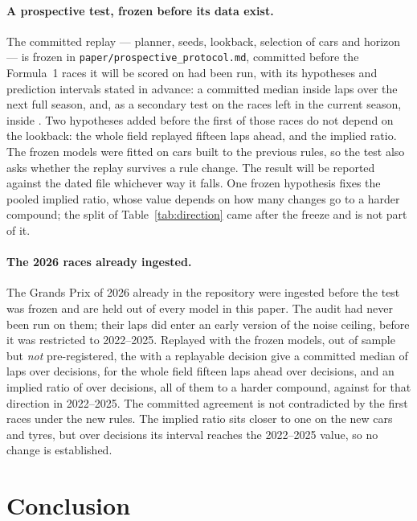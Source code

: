 \documentclass[11pt,a4paper]{article}
\begin{document}
\paragraph{A prospective test, frozen before its data exist.}
\label{sec:prospective}
The committed replay --- planner, seeds, lookback, selection of cars and horizon
--- is frozen in \texttt{paper/prospective\_protocol.md}, committed before the
Formula~1 races it will be scored on had been run, with its hypotheses and
prediction intervals stated in advance: a committed median inside
\ProspectivePiSeason{} laps over the next full season, and, as a secondary test
on the races left in the current season, inside \ProspectivePiFour{}. Two
hypotheses added before the first of those races do not depend on the lookback:
the whole field replayed fifteen laps ahead, and the implied ratio. The frozen
models were fitted on cars built to the previous rules, so the test also asks
whether the replay survives a rule change. The result will be reported against
the dated file whichever way it falls. One frozen hypothesis fixes the pooled
implied ratio, whose value depends on how many changes go to a harder compound;
the split of Table~\ref{tab:direction} came after the freeze and is not part
of it.

\paragraph{The 2026 races already ingested.} The \HeldIngested{} Grands Prix of
2026 already in the repository were ingested before the test was frozen and are held out of every model in
this paper. The audit had never been run on them; their laps did enter an early
version of the noise ceiling, before it was restricted to 2022--2025. Replayed
with the frozen models, out of sample but \emph{not} pre-registered, the
\HeldRaces{} with a replayable decision give a committed median of
\HeldMedian{} laps \HeldCi{} over \HeldN{} decisions, \HeldWideMedian{}
\HeldWideCi{} for the whole field fifteen laps ahead over \HeldWideN{}
decisions, and an implied ratio of \HeldImplied{} \HeldImpliedCi{} over
\HeldImpliedN{} decisions, all of them to a harder compound, against
\ImpliedHarder{} for that direction in 2022--2025. The committed agreement is
not contradicted by the first races under the new rules. The implied ratio sits closer to one on the new
cars and tyres, but over \HeldImpliedN{} decisions its interval reaches the
2022--2025 value, so no change is established.

\section{Conclusion}
\end{document}
